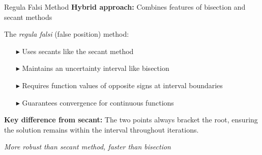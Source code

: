 \documentclass[aspectratio=169]{beamer}
\begin{document}
\begin{frame}{Regula Falsi Method}
   \textcolor{accentcolor}{\textbf{Hybrid approach:}} Combines features of bisection and secant methods
   
   \vspace{0.8em}
   
   The \textit{regula falsi} (false position) method:
   \begin{itemize}
       \item[$\blacktriangleright$] Uses secants like the secant method
       \item[$\blacktriangleright$] Maintains an uncertainty interval like bisection
       \item[$\blacktriangleright$] Requires function values of opposite signs at interval boundaries
       \item[$\blacktriangleright$] Guarantees convergence for continuous functions
   \end{itemize}
   
   \vspace{0.8em}
   
   \textcolor{NavyBlue}{\textbf{Key difference from secant:}} The two points always bracket the root, ensuring the solution remains within the interval throughout iterations.
   
   \vspace{0.8em}
   
   \begin{center}
   \small\textit{More robust than secant method, faster than bisection}
   \end{center}
\end{frame}
\end{document}
